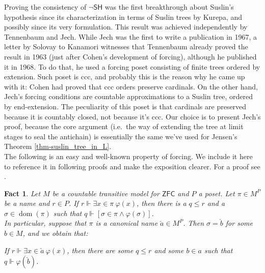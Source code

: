 \documentclass[11pt,a4paper]{report}
\newtheorem{fact}[theorem]{Fact}
\theoremstyle{definition}
\theoremstyle{num.custom-title}
\theoremstyle{custom-title}
\DeclareMathOperator{\dom}{dom}
\newcommand{\ZFC}{\ensuremath{\mathsf{ZFC}}\xspace}
\newcommand{\nSH}{\ensuremath{\neg\mathsf{SH}}\xspace}
\renewcommand{\phi}{\varphi}
\newcommand{\forces}{\Vdash}
\begin{document}
Proving the consistency of \nSH was the first breakthrough about Suslin's hypothesis since its characterization in terms of Suslin trees by Kurepa, and possibly since its very formulation. This result was achieved independently by Tennenbaum and Jech. While Jech was the first to write a publication in 1967, a letter by Solovay to Kanamori \cite{Kan2011} witnesses that Tennenbaum already proved the result in 1963 (just after Cohen's development of forcing), although he published it \cite{Ten1968} in 1968. To do that, he used a forcing poset consisting of finite trees ordered by extension. Such poset is ccc, and probably this is the reason why he came up with it: Cohen had proved that ccc orders preserve cardinals. On the other hand, Jech's forcing conditions are countable approximations to a Suslin tree, ordered by end-extension. The peculiarity of this poset is that cardinals are preserved because it is countably closed, not because it's ccc. Our choice is to present Jech's proof, because the core argument (i.e.\ the way of extending the tree at limit stages to seal the antichain) is essentially the same we've used for Jensen's Theorem \ref{thm-suslin_tree_in_L}.\\

The following is an easy and well-known property of forcing. We include it here to reference it in following proofs and make the exposition clearer. For a proof see \cite[p.\ 284]{Kun2013}.
\begin{fact}\label{fact-taking_out_of_forcing}
Let $M$ be a countable transitive model for \ZFC and $P$ a poset. Let $\pi \in M^P$ be a name and $r \in P$. If $r \forces \exists x \in \pi \ \phi(x)$, then there is a $q \leq r$ and a $\sigma \in \dom(\pi)$ such that $q \forces [\sigma \in \pi \wedge \phi(\sigma)]$.\\
In particular, suppose that $\pi$ is a canonical name $\check{a} \in M^P$. Then $\sigma = \check{b}$ for some $b \in M$, and we obtain that:
\begin{center}
If $r \forces \exists x \in \check{a} \ \phi(x)$, then there are some $q \leq r$ and some $b \in a$ such that $q \forces \phi(\check{b})$.
\end{center}
\end{fact}
\end{document}
